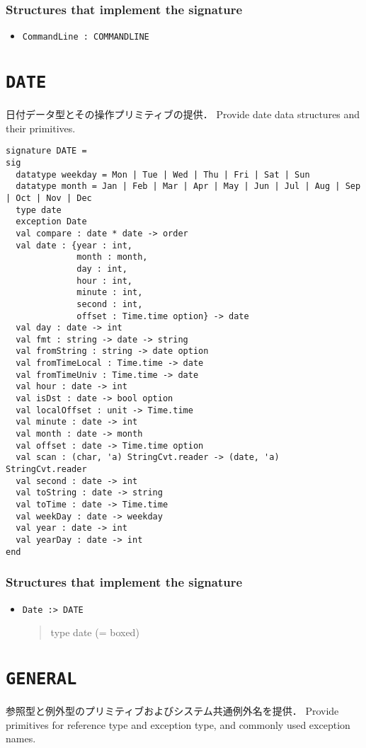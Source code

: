 \documentclass{jbook}
\newcommand{\txt}[2]{#2}
\newcommand{\code}[1]{\mbox{\large\tt #1}}
\newenvironment{program}{\begin{quote}\begin{tt}}%
                        {\end{tt}\end{quote}}
\newcommand{\signature}[2]{
\section{{\tt #1}}\label{section:reference:#2}
}
\newcommand{\Structure}{\subsubsection*{\txt{シグネチャを実装するストラクチャ}{Structures that implement the signature}}}
\begin{document}
\Structure
\begin{itemize}
\item \code{CommandLine : COMMANDLINE}
\end{itemize}

\signature{DATE}{DATE}
\ifjp%
	日付データ型とその操作プリミティブの提供．
\else%
	Provide date data structures and their primitives.
\fi%

\begin{verbatim}
signature DATE =
sig
  datatype weekday = Mon | Tue | Wed | Thu | Fri | Sat | Sun
  datatype month = Jan | Feb | Mar | Apr | May | Jun | Jul | Aug | Sep | Oct | Nov | Dec
  type date
  exception Date
  val compare : date * date -> order
  val date : {year : int,
              month : month,
              day : int,
              hour : int,
              minute : int,
              second : int,
              offset : Time.time option} -> date
  val day : date -> int
  val fmt : string -> date -> string
  val fromString : string -> date option
  val fromTimeLocal : Time.time -> date
  val fromTimeUniv : Time.time -> date
  val hour : date -> int
  val isDst : date -> bool option
  val localOffset : unit -> Time.time
  val minute : date -> int
  val month : date -> month
  val offset : date -> Time.time option
  val scan : (char, 'a) StringCvt.reader -> (date, 'a) StringCvt.reader
  val second : date -> int
  val toString : date -> string
  val toTime : date -> Time.time
  val weekDay : date -> weekday
  val year : date -> int
  val yearDay : date -> int
end
\end{verbatim}

\Structure
\begin{itemize}
\item \code{Date :> DATE}
\begin{program}
  type date (= boxed)
\end{program}
\end{itemize}

\signature{GENERAL}{GENERAL}
\ifjp%
	参照型と例外型のプリミティブおよびシステム共通例外名を提供．
\else%
	Provide primitives for reference type and exception type, and 
commonly used exception names.
\fi%
\end{document}
